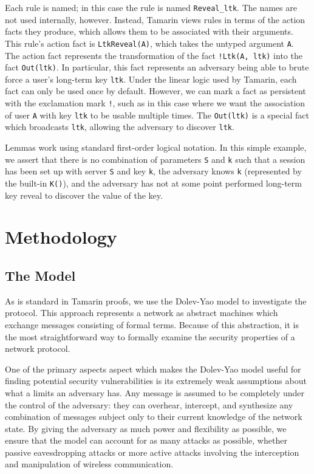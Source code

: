 \documentclass[10pt, pdftex]{article}
\begin{document}
Each rule is named; in this case the rule is named \verb|Reveal_ltk|. The names are not used internally, however. Instead, Tamarin views rules in terms of the action facts they produce, which allows them to be associated with their arguments. This rule's action fact is \verb|LtkReveal(A)|, which takes the untyped argument \verb|A|. The action fact represents the transformation of the fact \verb|!Ltk(A, ltk)| into the fact \verb|Out(ltk)|. In particular, this fact represents an adversary being able to brute force a user's long-term key \verb|ltk|. Under the linear logic used by Tamarin, each fact can only be used once by default. However, we can mark a fact as persistent with the exclamation mark \verb|!|, such as in this case where we want the association of user \verb|A| with key \verb|ltk| to be usable multiple times. The \verb|Out(ltk)| is a special fact which broadcasts \verb|ltk|, allowing the adversary to discover \verb|ltk|.

Lemmas work using standard first-order logical notation. In this simple example, we assert that there is no combination of parameters \verb|S| and \verb|k| such that a session has been set up with server \verb|S| and key \verb|k|, the adversary knows \verb|k| (represented by the built-in \verb|K()|), and the adversary has not at some point performed long-term key reveal to discover the value of the key.

\section{Methodology}

\subsection{The Model}

As is standard in Tamarin proofs, we use the Dolev-Yao model to investigate the protocol. This approach represents a network as abstract machines which exchange messages consisting of formal terms. Because of this abstraction, it is the most straightforward way to formally examine the security properties of a network protocol.

One of the primary aspects aspect which makes the Dolev-Yao model useful for finding potential security vulnerabilities is its extremely weak assumptions about what a limits an adversary has. Any message is assumed to be completely under the control of the adversary: they can overhear, intercept, and synthesize any combination of messages subject only to their current knowledge of the network state. By giving the adversary as much power and flexibility as possible, we ensure that the model can account for as many attacks as possible, whether passive eavesdropping attacks or more active attacks involving the interception and manipulation of wireless communication.
\end{document}
